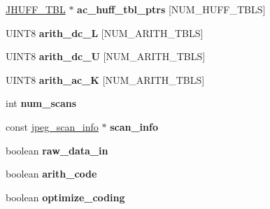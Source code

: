 \begin{DoxyCompactItemize}
\mbox{\label{structjpeg__compress__struct_ae4b1e3f753fe2e80c3e4d8d8c5dcd9db}} 
\hyperlink{structJHUFF__TBL}{J\+H\+U\+F\+F\+\_\+\+T\+BL} $\ast$ {\bfseries ac\+\_\+huff\+\_\+tbl\+\_\+ptrs} \mbox{[}N\+U\+M\+\_\+\+H\+U\+F\+F\+\_\+\+T\+B\+LS\mbox{]}
\item 
\mbox{\label{structjpeg__compress__struct_abcd6601461f6531a1b8f1e011772722d}} 
U\+I\+N\+T8 {\bfseries arith\+\_\+dc\+\_\+L} \mbox{[}N\+U\+M\+\_\+\+A\+R\+I\+T\+H\+\_\+\+T\+B\+LS\mbox{]}
\item 
\mbox{\label{structjpeg__compress__struct_ad760a336abaa98563938ffe076eb54f7}} 
U\+I\+N\+T8 {\bfseries arith\+\_\+dc\+\_\+U} \mbox{[}N\+U\+M\+\_\+\+A\+R\+I\+T\+H\+\_\+\+T\+B\+LS\mbox{]}
\item 
\mbox{\label{structjpeg__compress__struct_a6b96f1e8cf5e553b4485c92cc4360d42}} 
U\+I\+N\+T8 {\bfseries arith\+\_\+ac\+\_\+K} \mbox{[}N\+U\+M\+\_\+\+A\+R\+I\+T\+H\+\_\+\+T\+B\+LS\mbox{]}
\item 
\mbox{\label{structjpeg__compress__struct_abf2f96c340659a09a9ce08469a17e08b}} 
int {\bfseries num\+\_\+scans}
\item 
\mbox{\label{structjpeg__compress__struct_a58a76d81ea3f48502c765880c50facdf}} 
const \hyperlink{structjpeg__scan__info}{jpeg\+\_\+scan\+\_\+info} $\ast$ {\bfseries scan\+\_\+info}
\item 
\mbox{\label{structjpeg__compress__struct_a7f9dfd37243943bc138815bcf1e89584}} 
boolean {\bfseries raw\+\_\+data\+\_\+in}
\item 
\mbox{\label{structjpeg__compress__struct_a93a42fe4e984ab0afff45636e23d538a}} 
boolean {\bfseries arith\+\_\+code}
\item 
\mbox{\label{structjpeg__compress__struct_a2ed9c1e2bd808fd684338a009a164ef3}} 
boolean {\bfseries optimize\+\_\+coding}
\item 
\mbox{\label{structjpeg__compress__struct_abf474ed47e9f0a9c066bc47de5b0e8e7}} 

\end{DoxyCompactItemize}
